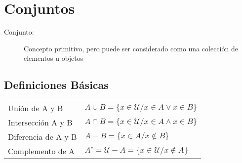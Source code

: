 \newpage
\section{Conjuntos}
\begin{description}
  \item[Conjunto:] Concepto primitivo, pero puede ser considerado como una colección de elementos u objetos 
\end{description}

\subsection{Definiciones Básicas}

\begingroup
\setlength{\tabcolsep}{5pt} %
\renewcommand{\arraystretch}{1.5} %
\begin{center}
  \begin{tabular}{l|l}
    Unión de A y B& $A \cup B = \lbrace x \in \mathcal{U} / x \in A \vee x \in B \rbrace$\\
    Intersección A y B&$A \cap B = \lbrace x \in \mathcal{U} / x \in A \wedge x \in B \rbrace$\\
    Diferencia de A y B&$A - B = \lbrace x \in A / x \notin B \rbrace$\\
    Complemento de A&$A^c = \mathcal{U} - A = \lbrace x \in \mathcal{U} / x \notin A \rbrace$
  \end{tabular}
\end{center}
\endgroup

